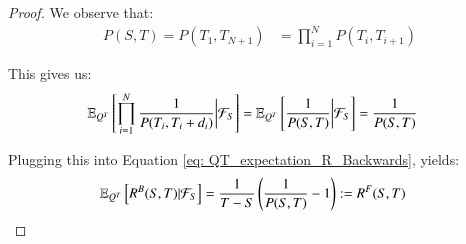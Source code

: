 \begin{proof}
We observe that: 
\begin{align*}
P(S,T) = P(T_{1}, T_{N+1}) &= \prod_{i=1}^{N}P(T_{i}, T_{i+1})    
\end{align*}

This gives us:
\begin{align*}
\mathbb{E}_{Q^{T}}\left[
\prod_{i=1}^{N}\frac{
1
}{
P(T_{i}, T_{i} + d_{i})
}
\bigg{|}\mathcal{F}_{S}
\right]
&= 
\mathbb{E}_{Q^{T}}\left[
\frac{1}{P(S,T)}
\bigg{|}\mathcal{F}_{S}\right]
= \frac{1}{P(S,T)}
\end{align*}

Plugging this into Equation \ref{eq: QT_expectation_R_Backwards}, yields: 
\begin{align*}
\mathbb{E}_{Q^{T}}\left[
R^{B}(S,T)|\mathcal{F}_{S}
\right] 
&= 
\frac{1}{T-S}
\left(
\frac{1}{P(S,T)} - 1
\right) := R^{F}(S,T)
\end{align*}
\end{proof}

